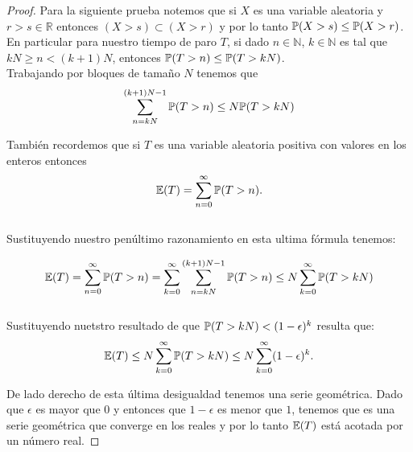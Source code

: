 \begin{proof}
	
	Para la siguiente prueba notemos que si $X$ es una variable aleatoria y $r > s \in \mathbb{R}$ entonces
	$(X > s) \subset (X > r)$ y por lo tanto $\mathbb{P}(X > s) \leq \mathbb{P}(X > r)$.\\
	
	En particular para nuestro tiempo de paro $T$, si dado $n \in \mathbb{N}$, $k \in \mathbb{N}$ es tal que 
	$kN \geq n < (k+1)N$, entonces $\mathbb{P}(T > n) \leq \mathbb{P}(T > kN)$.\\	

	Trabajando por bloques de tamaño $N$ tenemos que 
	$$\sum_{n = kN}^{(k+1)N -1} \mathbb{P}(T > n) \leq N \mathbb{P}(T > kN)$$	
	
	También recordemos que si $T$ es una variable aleatoria positiva con valores en los enteros entonces 
	$$\mathbb{E}(T) = \sum_{n=0}^{\infty} \mathbb{P}(T > n).$$\\
	
	Sustituyendo nuestro penúltimo razonamiento en esta ultima fórmula tenemos:
	
	$$\mathbb{E}(T) = \sum_{n=0}^{\infty} \mathbb{P}(T > n) = 
	\sum_{k=0}^{\infty} \sum_{n = kN}^{(k+1)N -1} \mathbb{P}(T > n) \leq N \sum_{k=0}^{\infty} \mathbb{P}(T > kN)$$\\
		
	Sustituyendo nuetstro resultado de que $\mathbb{P}(T>kN)<(1-\epsilon)^{k}$ resulta que:
	$$\mathbb{E}(T)\leq N \sum_{k=0}^{\infty} \mathbb{P}(T > kN) \leq N \sum_{k=0}^{\infty} (1-\epsilon)^k.$$
	
	De lado derecho de esta última desigualdad tenemos una serie geométrica. Dado que $\epsilon$ es mayor 
	que $0$ y entonces que $1-\epsilon$ es menor que $1$, tenemos que es una serie geométrica que converge 
	en los reales y por lo tanto $\mathbb{E}(T)$ está acotada por un número real.
	
\end{proof}	